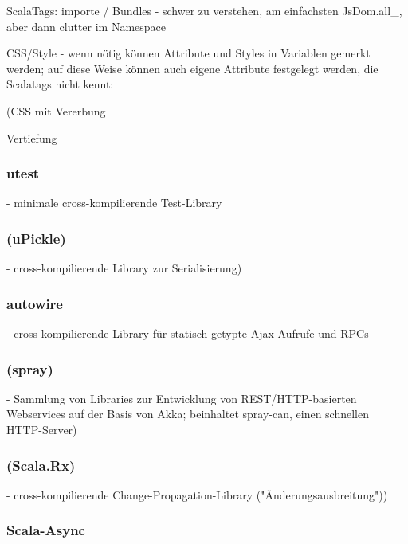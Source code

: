 \documentclass[a4paper, 12pt, hidelinks, listof=totoc, listoftables=totoc, bibliography=totoc]{scrreprt}
\begin{document}
ScalaTags: importe / Bundles - schwer zu verstehen, am einfachsten JsDom.all\_, aber dann clutter im Namespace

CSS/Style - wenn nötig können Attribute und Styles in Variablen gemerkt werden; auf diese Weise können auch eigene Attribute festgelegt werden, die Scalatags nicht kennt:

(CSS mit Vererbung

Vertiefung


\subsubsection{utest}

- minimale cross-kompilierende Test-Library


\subsubsection{(uPickle)}

- cross-kompilierende Library zur Serialisierung)


\subsubsection{autowire}

- cross-kompilierende Library für statisch getypte Ajax-Aufrufe und RPCs

\subsubsection{(spray)}

- Sammlung von Libraries zur Entwicklung von REST/HTTP-basierten Webservices auf der Basis von Akka; beinhaltet spray-can, einen schnellen HTTP-Server)

\subsubsection{(Scala.Rx)}

- cross-kompilierende Change-Propagation-Library ("Änderungsausbreitung"))

\subsubsection{Scala-Async}
\end{document}
